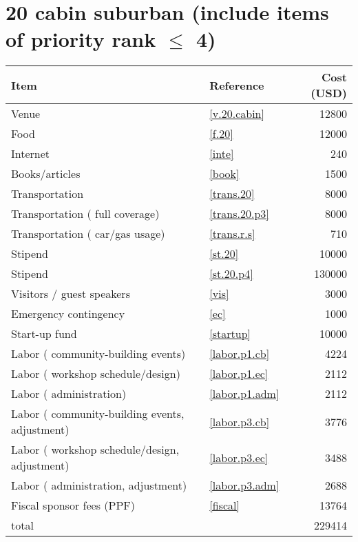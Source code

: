 \section*{20 cabin suburban (include items of priority rank $\leq$ 4)}
\begin{center}
\begin{tabular}{llr}
Item & Reference & Cost (USD) \\ \hline
Venue & \ref{v.20.cabin} & 12800 \\
Food & \ref{f.20} & 12000 \\
Internet & \ref{inte} & 240 \\
Books/articles & \ref{book} & 1500 \\
Transportation & \ref{trans.20} & 8000 \\
Transportation ( full coverage) & \ref{trans.20.p3} & 8000 \\
Transportation ( car/gas usage) & \ref{trans.r.s} & 710 \\
Stipend & \ref{st.20} & 10000 \\
Stipend & \ref{st.20.p4} & 130000 \\
Visitors / guest speakers & \ref{vis} & 3000 \\
Emergency contingency & \ref{ec} & 1000 \\
Start-up fund & \ref{startup} & 10000 \\
Labor ( community-building events) & \ref{labor.p1.cb} & 4224 \\
Labor ( workshop schedule/design) & \ref{labor.p1.ec} & 2112 \\
Labor ( administration) & \ref{labor.p1.adm} & 2112 \\
Labor ( community-building events, adjustment) & \ref{labor.p3.cb} & 3776 \\
Labor ( workshop schedule/design, adjustment) & \ref{labor.p3.ec} & 3488 \\
Labor ( administration, adjustment) & \ref{labor.p3.adm} & 2688 \\
Fiscal sponsor fees (PPF) & \ref{fiscal} & 13764 \\ \hline
total &  & 229414
\end{tabular}
\end{center}
\newpage

